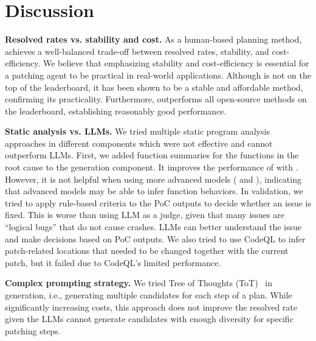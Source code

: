 \section{Discussion}
\label{sec:discussion}

\noindent\textbf{Resolved rates vs. stability and cost.}
As a human-based planning method, \sys achieves a well-balanced trade-off between resolved rates, stability, and cost-efficiency.
We believe that emphasizing stability and cost-efficiency is essential for a patching agent to be practical in real-world applications. 
Although \sys is not on the top of the leaderboard, it has been shown to be a stable and affordable method, confirming its practicality. 
Furthermore, \sys outperforms all open-source methods on the leaderboard, establishing reasonably good performance. 

\noindent\textbf{Static analysis vs. LLMs.}
We tried multiple static program analysis approaches in different components which were not effective and cannot outperform LLMs.
First, we added function summaries for the functions in the root cause to the generation component.
It improves the performance of \sys with \gpt.
However, it is not helpful when using more advanced models (\oo{} and \claude{}), indicating that advanced models may be able to infer function behaviors. 
In validation, we tried to apply rule-based criteria to the PoC outputs to decide whether an issue is fixed.
This is worse than using LLM as a judge, given that many issues are ``logical bugs'' that do not cause crashes. 
LLMs can better understand the issue and make decisions based on PoC outputs.
We also tried to use CodeQL to infer patch-related locations that needed to be changed together with the current patch, but it failed due to CodeQL's limited performance. 

\noindent\textbf{Complex prompting strategy.}
We tried Tree of Thoughts (ToT)~\cite{yao2024tree} in generation, i.e., generating multiple candidates for each step of a plan.
While significantly increasing costs, this approach does not improve the resolved rate given the LLMs cannot generate candidates with enough diversity for specific patching steps. 
